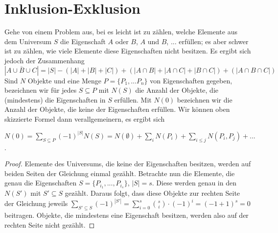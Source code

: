 \chapter{Inklusion-Exklusion}

  
  Gehe von einem Problem aus, bei es leicht ist zu zählen, welche Elemente aus dem Universum \(S\) die Eigenschaft \(A\) oder \(B\), \(A\) und \(B\), ... erfüllen; es aber schwer ist zu zählen, wie viele Elemente diese Eigenschaften nicht besitzen. Es ergibt sich jedoch der Zusammenhang
  \[
    | \overline{A \cup B \cup C} | = |S| - ( |A| + |B| + |C| ) + ( |A \cap B| + |A \cap C| + |B \cap C| ) + ( | A \cap B \cap C | )
  \]
  Sind \(N\) Objekte und eine Menge \(P = \{ P_1, ... P_n \}\) von Eigenschaften gegeben, bezeichnen wir für jedes \(S \subseteq P\) mit \(N(S)\) die Anzahl der Objekte, die (mindestens) die Eigenschaften in \(S\) erfüllen. Mit \(N(0)\) bezeichnen wir die Anzahl der Objekte, die keine der Eigenschaften erfüllen. Wir können oben skizzierte Formel dann verallgemeinern, es ergibt sich
  
  \begin{theorem}
    \(N(0) = \sum_{S \subseteq P} (-1)^{|S|} N(S) = N(\emptyset) + \sum_i N(P_i) + \sum_{i \leq j} N(P_i, P_j) + ...\).
  \end{theorem}
  
  \begin{proof}
    Elemente des Universums, die keine der Eigenschaften besitzen, werden auf beiden Seiten der Gleichung einmal gezählt. Betrachte nun die Elemente, die genau die Eigenschaften \(S = \{ P_{i_1}, ..., P_{i_s}\}\), \(|S| = s\). Diese werden genau in den \(N(S')\) mit \(S' \subseteq S\) gezählt. Daraus folgt, dass diese Objekte zur rechten Seite der Gleichung jeweils \( \sum_{S' \subseteq S} (-1)^{|S'|} = \sum_{i=0}^s \binom{s}{i} \cdot (-1)^i = (-1 + 1)^s = 0\) beitragen. Objekte, die mindestens eine Eigenschaft besitzen, werden also auf der rechten Seite nicht gezählt.
  \end{proof}


